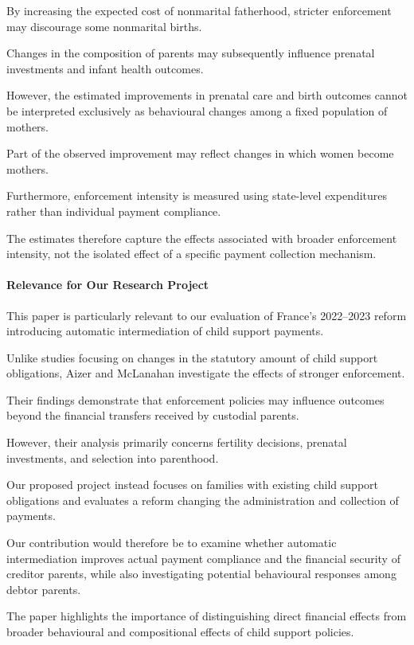 \documentclass{article}
\begin{document}
By increasing the expected cost of nonmarital
fatherhood, stricter enforcement may discourage
some nonmarital births.

Changes in the composition of parents may
subsequently influence prenatal investments
and infant health outcomes.

However, the estimated improvements in prenatal
care and birth outcomes cannot be interpreted
exclusively as behavioural changes among
a fixed population of mothers.

Part of the observed improvement may reflect
changes in which women become mothers.

Furthermore, enforcement intensity is measured
using state-level expenditures rather than
individual payment compliance.

The estimates therefore capture the effects
associated with broader enforcement intensity,
not the isolated effect of a specific
payment collection mechanism.

\paragraph{Relevance for Our Research Project}

This paper is particularly relevant to our
evaluation of France's 2022--2023 reform
introducing automatic intermediation
of child support payments.

Unlike studies focusing on changes in the
statutory amount of child support obligations,
Aizer and McLanahan investigate the effects
of stronger enforcement.

Their findings demonstrate that enforcement
policies may influence outcomes beyond
the financial transfers received by
custodial parents.

However, their analysis primarily concerns
fertility decisions, prenatal investments,
and selection into parenthood.

Our proposed project instead focuses on
families with existing child support obligations
and evaluates a reform changing the
administration and collection of payments.

Our contribution would therefore be to examine
whether automatic intermediation improves
actual payment compliance and the financial
security of creditor parents, while also
investigating potential behavioural responses
among debtor parents.

The paper highlights the importance of
distinguishing direct financial effects
from broader behavioural and compositional
effects of child support policies.
\end{document}
